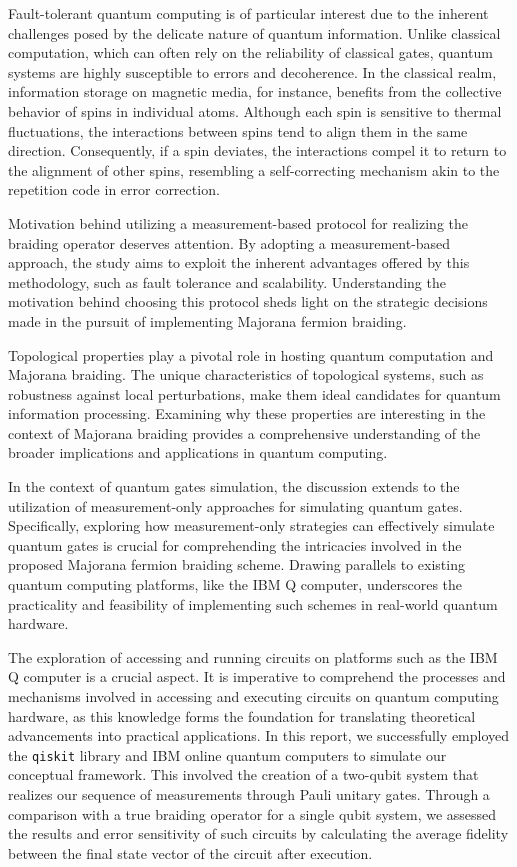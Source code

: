 \documentclass{article}
\def\c#1{\texttt{#1}}
\begin{document}
Fault-tolerant quantum computing is of particular interest due to the inherent challenges posed by the delicate nature of quantum information. Unlike classical computation, which can often rely on the reliability of classical gates, quantum systems are highly susceptible to errors and decoherence. In the classical realm, information storage on magnetic media, for instance, benefits from the collective behavior of spins in individual atoms. Although each spin is sensitive to thermal fluctuations, the interactions between spins tend to align them in the same direction. Consequently, if a spin deviates, the interactions compel it to return to the alignment of other spins, resembling a self-correcting mechanism akin to the repetition code in error correction.\cite{Kitaev_2003}

Motivation behind utilizing a measurement-based protocol for realizing the braiding operator deserves attention. By adopting a measurement-based approach, the study aims to exploit the inherent advantages offered by this methodology, such as fault tolerance and scalability. Understanding the motivation behind choosing this protocol sheds light on the strategic decisions made in the pursuit of implementing Majorana fermion braiding.

Topological properties play a pivotal role in hosting quantum computation and Majorana braiding. The unique characteristics of topological systems, such as robustness against local perturbations, make them ideal candidates for quantum information processing. Examining why these properties are interesting in the context of Majorana braiding provides a comprehensive understanding of the broader implications and applications in quantum computing.

In the context of quantum gates simulation, the discussion extends to the utilization of measurement-only approaches for simulating quantum gates. Specifically, exploring how measurement-only strategies can effectively simulate quantum gates is crucial for comprehending the intricacies involved in the proposed Majorana fermion braiding scheme. Drawing parallels to existing quantum computing platforms, like the IBM Q computer, underscores the practicality and feasibility of implementing such schemes in real-world quantum hardware.

The exploration of accessing and running circuits on platforms such as the IBM Q computer is a crucial aspect. It is imperative to comprehend the processes and mechanisms involved in accessing and executing circuits on quantum computing hardware, as this knowledge forms the foundation for translating theoretical advancements into practical applications. In this report, we successfully employed the \c{qiskit} library and IBM online quantum computers to simulate our conceptual framework. This involved the creation of a two-qubit system that realizes our sequence of measurements through Pauli unitary gates. Through a comparison with a true braiding operator for a single qubit system, we assessed the results and error sensitivity of such circuits by calculating the average fidelity between the final state vector of the circuit after execution.
\end{document}

